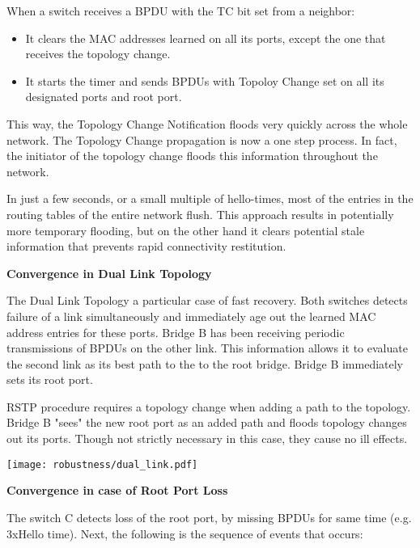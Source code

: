 When a switch receives a BPDU with the TC bit set from a neighbor:

\begin{itemize}
 
	\item It clears the MAC addresses learned on all its ports, except the 
one that receives the topology change. 
	\item It starts the timer and sends BPDUs with Topoloy Change set on all
 its designated ports and root port.
\end{itemize}

This way, the Topology Change Notification floods very quickly across the whole 
network. The Topology Change propagation is now a one step process. In fact, the
initiator of the topology change floods this information throughout the network.

In just a few seconds, or a small multiple of hello-times, most of the entries 
in the routing tables of the entire network flush. This approach results in
potentially more temporary flooding, but on the other hand it clears potential
stale information that prevents rapid connectivity restitution. 



\textbf{Convergence in Dual Link Topology}

The Dual Link Topology a particular case of fast recovery. Both switches detects
 failure of a link  simultaneously and immediately age out the learned MAC
address entries for these ports. Bridge B has been receiving periodic
transmissions of BPDUs on the other link. This information allows it to evaluate
the second link as its best path to the to the root bridge. Bridge B immediately
sets its root port. 

RSTP procedure requires a topology change when adding a path to the topology. 
Bridge B "sees" the new root port as an added path and floods topology changes
out its ports. Though not strictly necessary in this case, they cause no ill
effects.

\begin{center}
        \texttt{[image: robustness/dual\_link.pdf]}
        \label{fig:idual_link}
\end{center}

\textbf{Convergence in case of Root Port Loss}

The switch C  detects loss of the root port, by missing BPDUs for same time 
(e.g. 3xHello time). Next, the following is the sequence of events that occurs:

